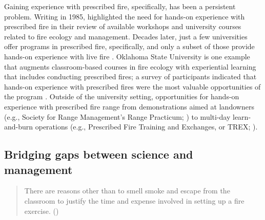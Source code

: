 \documentclass[fire,article,submit,moreauthors,pdftex]{Definitions/mdpi}
\begin{document}
Gaining experience with prescribed fire, specifically, has been a persistent problem.
Writing in 1985, \citet{heitlinger1985} highlighted the need for hands-on experience with prescribed fire in their review of available workshops and university courses related to fire ecology and management.
Decades later, just a few universities offer programs in prescribed fire, specifically, and only a subset of those provide hands-on experience with live fire \citep{kobziar2009}.
Oklahoma State University is one example that augments classroom-based courses in fire ecology with experiential learning that includes conducting prescribed fires; a survey of participants indicated that hands-on experience with prescribed fires were the most valuable opportunities of the program \citep{scasta2015}.
Outside of the university setting, opportunities for hands-on experience with prescribed fire range from demonstrations aimed at landowners (e.g., Society for Range Management's Range Practicum; \citep{barnes2021}) to multi-day learn-and-burn operations (e.g., Prescribed Fire Training and Exchanges, or TREX; \citep{spencer2015}).

\subsection{Bridging gaps between science and management}

\begin{quote}
There are reasons other than to smell smoke and escape from the classroom to justify the time and expense involved in setting up a fire exercise. (\citet[][p.~50]{andrews1989})
\end{quote}
\end{document}
